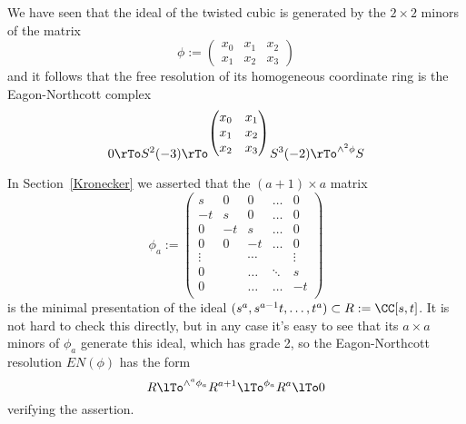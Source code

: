 \begin{example}
We have seen that the ideal of the twisted cubic is generated by the $2\times 2$ minors of the matrix
$$
\phi :=  
\begin{pmatrix}
 x_{0}&x_{1}&x_{2}\\
 x_{1}&x_{2}&x_{3}
\end{pmatrix}
$$
and it follows that the free resolution of its homogeneous coordinate ring is the Eagon-Northcott complex
$$
0\rTo S^{2}(-3) 
\rTo^{\begin{pmatrix}
 x_{0}&x_{1}\\
  x_{1}&x_{2}\\
x_{2}&x_{3}
\end{pmatrix}
}
S^{3}(-2)
\rTo^{\wedge^{2}\phi}
S
$$
\end{example}

\begin{example}\label{res of max ideal power}
In Section~\ref{Kronecker} we asserted that  the $(a+1)\times a$  matrix
$$
\phi_{a} :=\begin{pmatrix}
s&0&0&\dots&0\\
-t&s&0&\dots&0\\
0&-t&s&\dots&0\\
0&0&-t&\dots&0\\
\vdots&&\cdots&&\vdots\\
0&&\dots&\ddots&s\\
0&&\dots&\dots&-t\\
\end{pmatrix}
$$
is the minimal presentation of the ideal $(s^{a},s^{a-1}t, \dots, t^{a}) \subset R:=\CC[s,t]$. It is not hard to check this
directly, but in any case it's easy to see that its $a\times a$ minors of $\phi_{a}$ generate this ideal, which has grade 2, so the Eagon-Northcott resolution $EN(\phi)$
has the form
$$
R\lTo^{\wedge^{a}\phi_{a}} R^{a+1} \lTo^{ \phi_{a}} R^{a} \lTo 0
$$
verifying the assertion.
\end{example}

